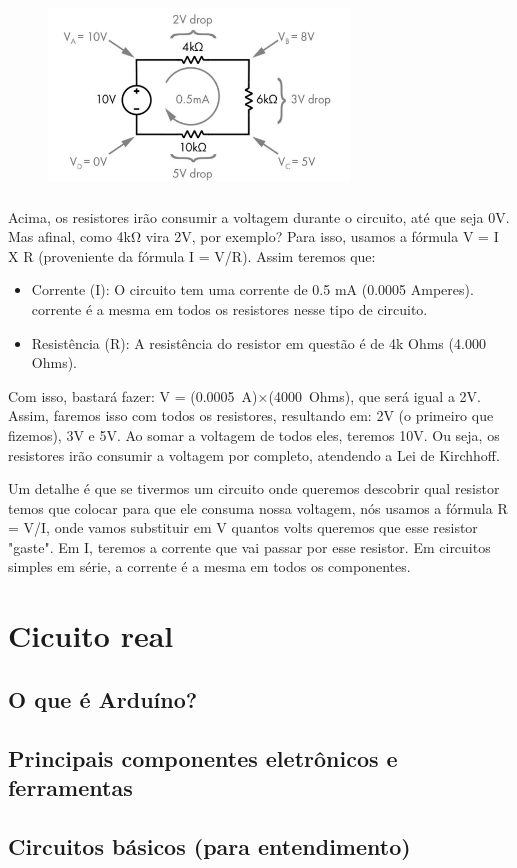 \documentclass{report}
\begin{document}
	\begin{figure}[ht]
		\centering
		\includegraphics[width=8cm,height=5cm,keepaspectratio=false]{imagens/kirchhoff.png}

	\end{figure}
	
	Acima, os resistores irão consumir a voltagem durante o circuito, até que seja 0V. Mas afinal, como 4kΩ vira 2V, por exemplo? Para isso, usamos a fórmula V = I X R (proveniente da fórmula I = V/R). Assim teremos que:
	\begin{itemize}
		\item Corrente (I): O circuito tem uma corrente de 0.5 mA (0.0005 Amperes). corrente é a mesma em todos os resistores nesse tipo de circuito.
		\item Resistência (R): A resistência do resistor em questão é de 4k Ohms (4.000 Ohms).
	\end{itemize}
	
	Com isso, bastará fazer: V = (0.0005 A)×(4000 Ohms), que será igual a 2V. Assim, faremos isso com todos os resistores, resultando em: 2V (o primeiro que fizemos), 3V e 5V. Ao somar a voltagem de todos eles, teremos 10V. Ou seja, os resistores irão consumir a voltagem por completo, atendendo a Lei de Kirchhoff.
	
	Um detalhe é que se tivermos um circuito onde queremos descobrir qual resistor temos que colocar para que ele consuma nossa voltagem, nós usamos a fórmula R = V/I, onde vamos substituir em V quantos volts queremos que esse resistor "gaste". Em I, teremos a corrente que vai passar por esse resistor. Em circuitos simples em série, a corrente é a mesma em todos os componentes. 
	
	\chapter{Cicuito real}
	\section{O que é Arduíno?}
	\section{Principais componentes eletrônicos e ferramentas}
	\section{Circuitos básicos (para entendimento)}
\end{document}
